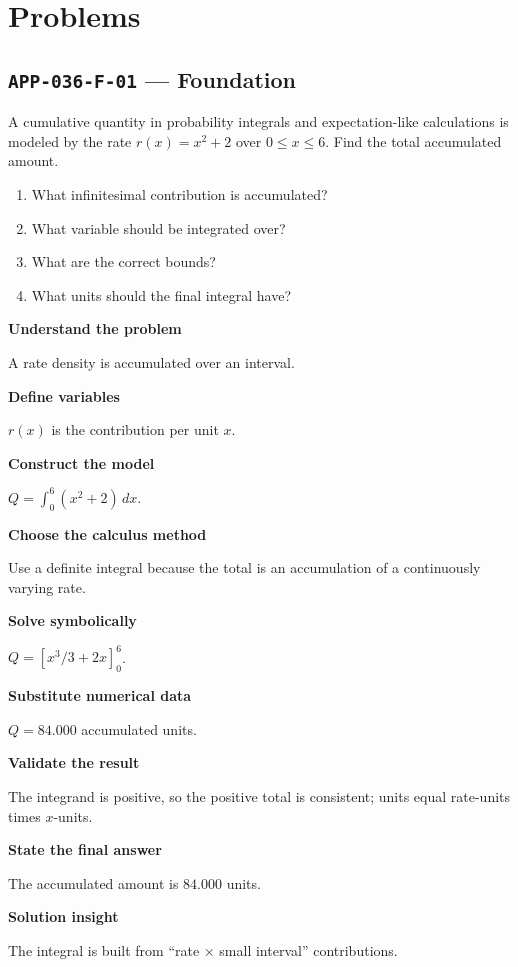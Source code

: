 \documentclass[11pt]{book}
\newcommand{\pid}[1]{\texttt{#1}}
\begin{document}
\section*{Problems}
\subsection*{\pid{APP-036-F-01} — Foundation}
\begin{problembox}
A cumulative quantity in probability integrals and expectation-like calculations is modeled by the rate $r(x)=x^2+2$ over $0\le x\le 6$. Find the total accumulated amount.
\end{problembox}
\begin{promptbox}\begin{enumerate}
\item What infinitesimal contribution is accumulated?
\item What variable should be integrated over?
\item What are the correct bounds?
\item What units should the final integral have?
\end{enumerate}\end{promptbox}
\begin{solutionbox}
\textbf{Understand the problem}\par A rate density is accumulated over an interval.\par\medskip
\textbf{Define variables}\par $r(x)$ is the contribution per unit $x$.\par\medskip
\textbf{Construct the model}\par $Q=\int_0^{6}(x^2+2)\,dx$.\par\medskip
\textbf{Choose the calculus method}\par Use a definite integral because the total is an accumulation of a continuously varying rate.\par\medskip
\textbf{Solve symbolically}\par $Q=[x^3/3+2x]_0^{6}$.\par\medskip
\textbf{Substitute numerical data}\par $Q=84.000$ accumulated units.\par\medskip
\textbf{Validate the result}\par The integrand is positive, so the positive total is consistent; units equal rate-units times $x$-units.\par\medskip
\textbf{State the final answer}\par The accumulated amount is $84.000$ units.\par\medskip
\textbf{Solution insight}\par The integral is built from “rate × small interval” contributions.\par\medskip
\end{solutionbox}
\end{document}
